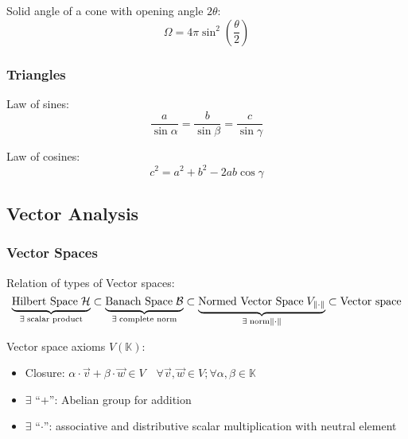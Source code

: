 			\noindent
			Solid angle of a cone with opening angle $2\theta$:
			\begin{equation}
				\Omega = 4\pi\sin^2\left(\frac{\theta}{2}\right)
			\end{equation}

		\subsubsection{Triangles}
			\noindent
			Law of sines:
			\begin{equation}
				\frac{a}{\sin\alpha} = \frac{b}{\sin\beta} = \frac{c}{\sin\gamma}
			\end{equation}

			\noindent
			Law of cosines:
			\begin{equation}
				c^2 = a^2 + b^2 -2ab \cos\gamma
			\end{equation}


	\subsection{Vector Analysis}
		\subsubsection{Vector Spaces}
			Relation of types of Vector spaces:
			\begin{equation}
				\underbrace{\text{Hilbert Space}\;\mathcal{H}}_{\exists\; \text{scalar product}} \subset \underbrace{\text{Banach Space}\;\mathcal{B}}_{\exists\; \text{complete norm}} \subset \underbrace{\text{Normed Vector Space}\;V_{\norm{\cdot}}}_{\exists\; \text{norm} \norm{\cdot} } \subset \text{Vector space}
			\end{equation}

			\noindent
			Vector space axioms $V(\mathbb{K})$:
			\begin{itemize}
				\item Closure: $\alpha \cdot \vec{v} + \beta \cdot \vec{w} \in V \quad \forall \vec{v}, \vec{w} \in V; \forall \alpha, \beta \in \mathbb{K}$
				\item $\exists$ ``$+$'': Abelian group for addition
				\item $\exists$ ``$\cdot$'': associative and distributive scalar multiplication with neutral element
			\end{itemize}

